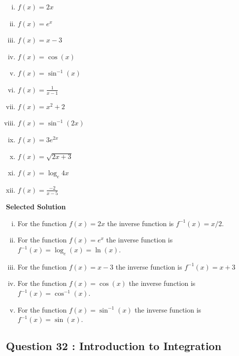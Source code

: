 \documentclass[]{article}
\begin{document}
\begin{multicols}{2}
	\begin{enumerate}[(i)]
		\item	$f(x) = 2x$
		\item	$f(x) =e^x$
		\item	$f(x) = x-3$
		
		\item	$f(x) =\cos(x)$
		\item	$f(x) = \sin^{-1}(x)$
		\item  ${f(x) = \displaystyle \frac{1}{x-1}}$
		
		\item	$f(x) = x^2+2$
		\item	$f(x) = \sin^{-1}(2x)$
		\item	$f(x) = 3 e^{2x}$
		\item $f(x) = \sqrt{2x+3}$
		\item $f(x) = \log_e{4x}$
		\item $ \displaystyle f(x) = \frac{-2}{x-5}$
	\end{enumerate}	
	\smallskip
\end{multicols}
\noindent \textbf{Selected Solution}
\begin{enumerate}[(i)]
	\item For the function $f(x) = 2x$ the inverse function is $f^{-1}(x) = x/2$.
	\item For the function	$f(x) =e^x$ the inverse function is  $f^{-1}(x) = \log_e(x) = \ln(x)$.
	\item For the function	$f(x) = x-3$ the inverse function is $f^{-1}(x) = x+3$
	
	\item For the function	$f(x) =\cos(x)$ the inverse function is $f^{-1}(x) = \cos^{-1}(x)$.
	\item For the function	$f(x) = \sin^{-1}(x)$ the inverse function is $f^{-1}(x) = \sin(x)$.
	
	
\end{enumerate}
\newpage


\subsection*{Question 32 : Introduction to Integration}
\end{document}
